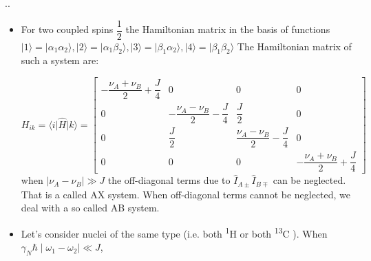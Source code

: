 \documentclass[handout]{beamer}
\begin{document}
\begin{frame}{\thesection.\thesubsection. \insertsubsection}
	\begin{itemize}[<+>]
		\item 
		For two coupled spins $\dfrac{1}{2}$ the Hamiltonian matrix in the basis of functions $\vert 1 \rangle =  \vert \alpha_1 \alpha_2 \rangle, \vert 2 \rangle =  \vert \alpha_1 \beta_2 \rangle, \vert 3 \rangle =  \vert \beta_1 \alpha_2 \rangle, \vert 4 \rangle =  \vert \beta_1 \beta_2 \rangle$
		The Hamiltonian matrix of such a system are:
		
		{\tiny
		\begin{equation}
		  H_{ik}= \langle i \vert \hat{H} \vert k \rangle = 
		   \begin{bmatrix}
                 -\dfrac{\nu_A+ \nu_{B}  }{2} + \dfrac{J}{4}   & 0 & 0 & 0 \\
                 0 & -\dfrac{\nu_A-\nu_B}{2} - \dfrac{J}{4}  & \dfrac{J}{2} & 0 \\
                 0 & \dfrac{J}{2} & \dfrac{\nu_A-\nu_B}{2} - \dfrac{J}{4}  & 0 \\
                 0 & 0 & 0 & -\dfrac{\nu_A+\nu_B}{2} + \dfrac{J}{4}                  
		   \end{bmatrix}
		\end{equation}
	    }%
	    when $\mid \nu_A -\nu_B \mid \gg J $ the off-diagonal terms due to $\hat{I}_{A\pm} \hat{I}_{B\mp}$ can be neglected. That is a called \alert{AX system}. When off-diagonal terms cannot be neglected, we deal with a so called \alert{AB system}.
	
		\item 
		
		Let's consider nuclei of the same type (i.e. both \textsuperscript{1}H or both \textsuperscript{13}C ). When $\gamma_N \hbar \mid \omega_1 -\omega_2 \mid \ll J $,
		
	\end{itemize}
	
	
\end{frame}
\end{document}
